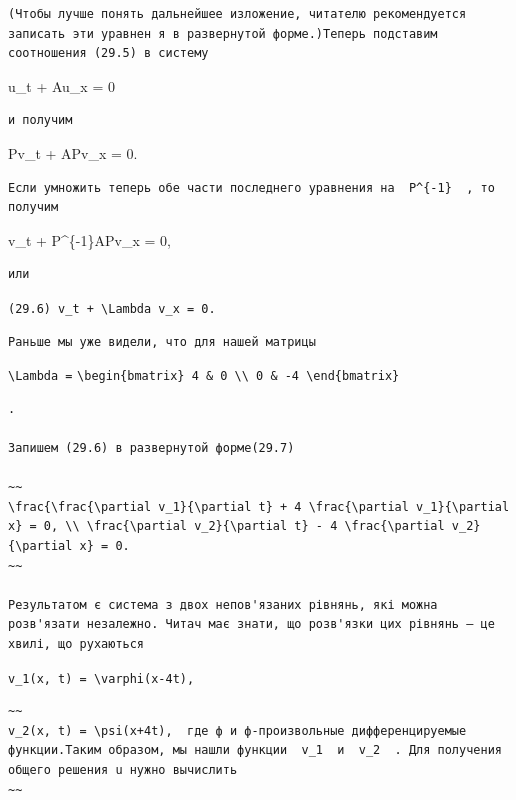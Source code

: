 \documentclass[
  ukrainian,
]{article}
\begin{document}
\begin{verbatim}
(Чтобы лучше понять дальнейшее изложение, читателю рекомендуется записать эти уравнен я в развернутой форме.)Теперь подставим соотношения (29.5) в систему
\end{verbatim}

u\_t + Au\_x = 0

\begin{verbatim}
и получим
\end{verbatim}

Pv\_t + APv\_x = 0.

\begin{verbatim}
Если умножить теперь обе части последнего уравнения на  P^{-1}  , то получим
\end{verbatim}

v\_t + P\^{}\{-1\}APv\_x = 0,

\begin{verbatim}
или
\end{verbatim}

\texttt{(29.6)\ v\_t\ +\ \textbackslash{}Lambda\ v\_x\ =\ 0.}

\begin{verbatim}
Раньше мы уже видели, что для нашей матрицы
\end{verbatim}

\texttt{\textbackslash{}Lambda\ =}
\texttt{\textbackslash{}begin\{bmatrix\}\ 4\ \&\ 0\ \textbackslash{}\textbackslash{}\ 0\ \&\ -4\ \textbackslash{}end\{bmatrix\}}

\begin{verbatim}
.

Запишем (29.6) в развернутой форме(29.7)

~~
\frac{\frac{\partial v_1}{\partial t} + 4 \frac{\partial v_1}{\partial x} = 0, \\ \frac{\partial v_2}{\partial t} - 4 \frac{\partial v_2}{\partial x} = 0.
~~

Результатом є система з двох непов'язаних рівнянь, які можна розв'язати незалежно. Читач має знати, що розв'язки цих рівнянь — це хвилі, що рухаються
\end{verbatim}

\texttt{v\_1(x,\ t)\ =\ \textbackslash{}varphi(x-4t),}

\begin{verbatim}
~~
v_2(x, t) = \psi(x+4t),  где ф и ф-произвольные дифференцируемые функции.Таким образом, мы нашли функции  v_1  и  v_2  . Для получения общего решения u нужно вычислить
~~
\end{verbatim}
\end{document}
